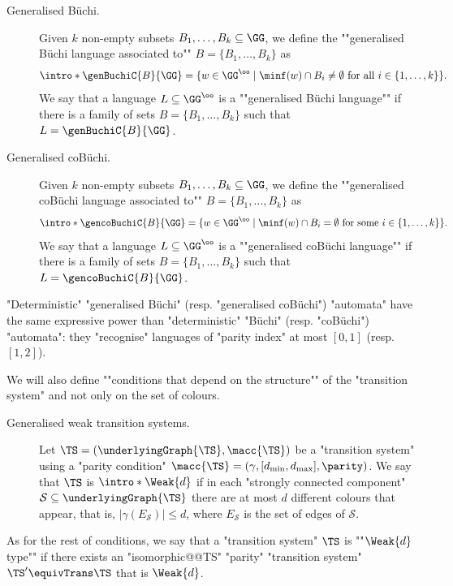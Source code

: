 \documentclass[10pt,a4paper]{amsart}
\renewcommand{\S}{\mathcal{S}}
\renewcommand{\gg}{\gamma}
\begin{document}
\begin{description}	
	\item[Generalised B\"uchi.] \AP Given $k$ non-empty subsets $B_1,\dots, B_k\subseteq \GG$, we define the ""generalised Büchi language associated to"" $B=\{B_1,\dots,B_k\}$ as
	\[ \intro*\genBuchiC{B}{\GG}  = \{w\in \GG^\oo \mid \minf(w) \cap B_i \neq \emptyset \text{ for all } i\in\{1,\dots, k\}\}. \]
	\AP We say that a language $L\subseteq \GG^\oo$ is a ""generalised B\"uchi language"" if there is a family of sets $B=\{B_1,\dots,B_k\}$ such that $L = \genBuchiC{B}{\GG}$.
	\item[Generalised coB\"uchi.] \AP Given $k$ non-empty subsets $B_1,\dots, B_k\subseteq \GG$, we define the ""generalised coB\"uchi language associated to"" $B=\{B_1,\dots,B_k\}$ as
	\[ \intro*\gencoBuchiC{B}{\GG}  = \{w\in \GG^\oo \mid \minf(w) \cap B_i = \emptyset \text{ for some } i\in\{1,\dots, k\}\}. \]
	\AP We say that a language $L\subseteq \GG^\oo$ is a ""generalised coB\"uchi language"" if there is a family of sets $B=\{B_1,\dots,B_k\}$ such that $L = \gencoBuchiC{B}{\GG}$.
\end{description}

\begin{remark}\label{rmk-app:genBuchi-expressive-power}
	"Deterministic" "generalised B\"uchi" (resp. "generalised coB\"uchi") "automata" have the same expressive power than "deterministic" "B\"uchi" (resp. "coB\"uchi") "automata": they "recognise" languages of "parity index" at most $[0,1]$ (resp. $[1,2]$).
\end{remark}

\AP We will also define ""conditions that depend on the structure"" of the "transition system" and not only on the set of colours.
\begin{description}	
	\item[Generalised weak transition systems.]\AP Let $\TS =(\underlyingGraph{\TS}, \macc{\TS})$ be a "transition system" using a "parity condition" $\macc{\TS}=(\gg, [d_{\min},d_{\max}], \parity)$. We say that $\TS$ is $\intro*\Weak{d}$ if in each "strongly connected component" $\S \subseteq \underlyingGraph{\TS}$ there are at most $d$ different colours that appear, that is, $|\gg(E_\S)| \leq d$, where $E_\S$ is the set of edges of $\S$.	
\end{description}

\AP As for the rest of conditions, we say that a "transition system" $\TS$ is ""$\Weak{d}$ type"" if there exists an "isomorphic@@TS" "parity" "transition system" $\TS'\equivTrans \TS$ that is $\Weak{d}$.
\end{document}
